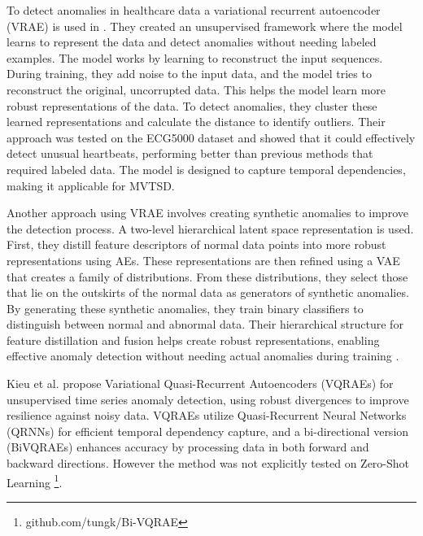 
To detect anomalies in healthcare data a variational recurrent autoencoder (VRAE) is used in \cite{pereira_learning_2019}. They created an unsupervised framework where the model learns to represent the data and detect anomalies without needing labeled examples.
The model works by learning to reconstruct the input sequences. During training, they add noise to the input data, and the model tries to reconstruct the original, uncorrupted data. This helps the model learn more robust representations of the data. To detect anomalies, they cluster these learned representations and calculate the distance to identify outliers. Their approach was tested on the ECG5000 dataset and showed that it could effectively detect unusual heartbeats, performing better than previous methods that required labeled data. The model is designed to capture temporal dependencies, making it applicable for MVTSD.

%
Another approach using VRAE involves creating synthetic anomalies to improve the detection process. A two-level hierarchical latent space representation is used. First, they distill feature descriptors of normal data points into more robust representations using AEs. These representations are then refined using a VAE that creates a family of distributions. From these distributions, they select those that lie on the outskirts of the normal data as generators of synthetic anomalies.
By generating these synthetic anomalies, they train binary classifiers to distinguish between normal and abnormal data. Their hierarchical structure for feature distillation and fusion helps create robust representations, enabling effective anomaly detection without needing actual anomalies during training \cite{ramirez_rivera_anomaly_2022}.

Kieu et al. propose Variational Quasi-Recurrent Autoencoders (VQRAEs) for unsupervised time series anomaly detection, using robust divergences to improve resilience against noisy data. VQRAEs utilize Quasi-Recurrent Neural Networks (QRNNs) for efficient temporal dependency capture, and a bi-directional version (BiVQRAEs) enhances accuracy by processing data in both forward and backward directions. However the method was not explicitly tested on Zero-Shot Learning \cite{kieu_anomaly_2022} \footnote{\fussy\tiny github.com/tungk/Bi-VQRAE}.


